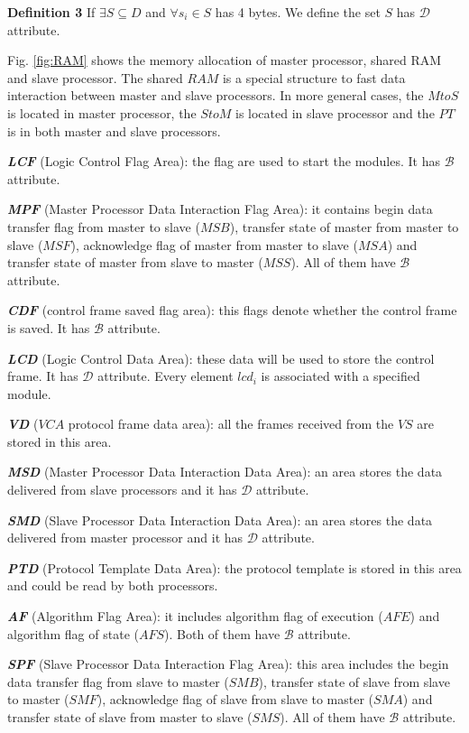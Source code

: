 \documentclass[journal,UTF8]{IEEEtran}
\begin{document}
\textbf{Definition 3} If $\exists S \subseteq D$ and $\forall s_{i} \in S$ has 4 bytes. We define the set $S$ has $\mathcal{D}$ attribute.

Fig. \ref{fig:RAM} shows the memory allocation of master processor, shared RAM and slave processor. The shared $RAM$ is a special structure to fast data interaction between master and slave processors. In more general cases, the $MtoS$ is located in master processor, the $StoM$ is located in slave processor and the $PT$ is in both master and slave processors. 

\textbf{\emph{LCF}} (Logic Control Flag Area): the flag are used to start the modules. It has $\mathcal{B}$ attribute.

\textbf{\emph{MPF}} (Master Processor Data Interaction Flag Area): it contains begin data transfer flag from master to slave ($MSB$), transfer state of master from master to slave ($MSF$), acknowledge flag of master from master to slave ($MSA$) and transfer state of master from slave to master ($MSS$). All of them have $\mathcal{B}$ attribute.


\textbf{\emph{CDF}} (control frame saved flag area): this flags denote whether the control frame is saved. It has $\mathcal{B}$ attribute.

\textbf{\emph{LCD}} (Logic Control Data Area): these data will be used to store the control frame. It has $\mathcal{D}$ attribute. Every element $lcd_i$ is associated with a specified module.

\textbf{\emph{VD}} ($VCA$ protocol frame data area): all the frames received from the $VS$ are stored in this area.

\textbf{\emph{MSD}} (Master Processor Data Interaction Data Area): an area stores the data delivered from slave processors and it has $\mathcal{D}$ attribute.

\textbf{\emph{SMD}} (Slave Processor Data Interaction Data Area): an area stores the data delivered from master processor and it has $\mathcal{D}$ attribute.

\textbf{\emph{PTD}} (Protocol Template Data Area): the protocol template is stored in this area and could be read by both processors.


\textbf{\emph{AF}} (Algorithm Flag Area): it includes algorithm flag of execution ($AFE$) and algorithm flag of state ($AFS$).
Both of them have $\mathcal{B}$ attribute.

\textbf{\emph{SPF}} (Slave Processor Data Interaction Flag Area): this area includes the begin data transfer flag from slave to master ($SMB$), transfer state of slave from slave to master ($SMF$), acknowledge flag of slave from slave to master ($SMA$) and transfer state of slave from master to slave ($SMS$). All of them have $\mathcal{B}$ attribute.
\end{document}
